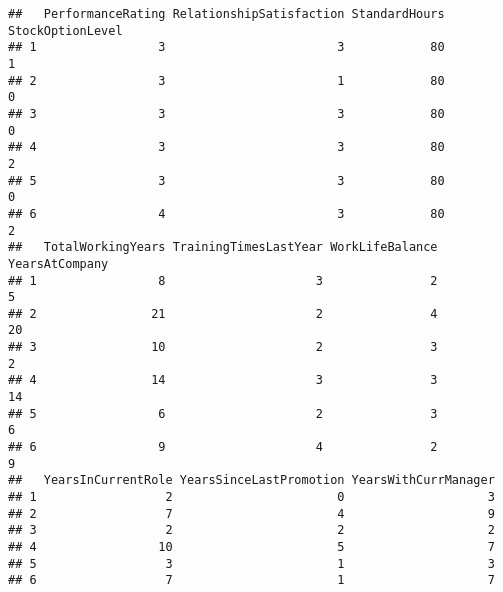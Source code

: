 \documentclass[
]{article}
\begin{document}
\begin{verbatim}
##   PerformanceRating RelationshipSatisfaction StandardHours StockOptionLevel
## 1                 3                        3            80                1
## 2                 3                        1            80                0
## 3                 3                        3            80                0
## 4                 3                        3            80                2
## 5                 3                        3            80                0
## 6                 4                        3            80                2
##   TotalWorkingYears TrainingTimesLastYear WorkLifeBalance YearsAtCompany
## 1                 8                     3               2              5
## 2                21                     2               4             20
## 3                10                     2               3              2
## 4                14                     3               3             14
## 5                 6                     2               3              6
## 6                 9                     4               2              9
##   YearsInCurrentRole YearsSinceLastPromotion YearsWithCurrManager
## 1                  2                       0                    3
## 2                  7                       4                    9
## 3                  2                       2                    2
## 4                 10                       5                    7
## 5                  3                       1                    3
## 6                  7                       1                    7
\end{verbatim}
\end{document}

